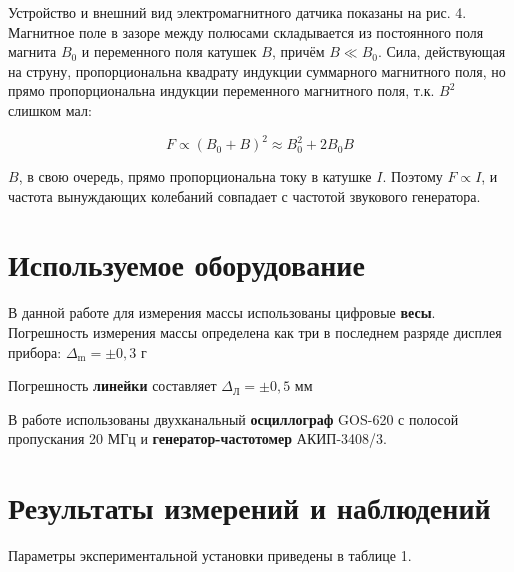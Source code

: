 \documentclass{article}
\begin{document}
\hspace{4mm} Устройство и внешний вид электромагнитного датчика показаны на рис. 4. Магнитное поле в зазоре между полюсами складывается из постоянного поля магнита $B_0$ и переменного поля катушек $B$, причём $B \ll B_0$. Сила, действующая на струну, пропорциональна квадрату индукции суммарного магнитного поля, но прямо пропорциональна индукции переменного магнитного поля, т.к. $B^2$ слишком мал:

\begin{equation}
	F \propto (B_0 + B)^2 \approx B_0^2 + 2B_0B
\end{equation}

$B$, в свою очередь, прямо пропорциональна току в катушке $I$. Поэтому $F \propto I$, и частота вынуждающих колебаний совпадает с частотой звукового генератора.



\section*{Используемое оборудование}

\hspace{4mm} В данной работе для измерения массы использованы цифровые \textbf{весы}. Погрешность измерения массы определена как три в последнем разряде дисплея прибора: $\Delta_{\text{m}} = \pm 0,3$ г

Погрешность \textbf{линейки} составляет $\Delta_{\text{Л}} = \pm 0,5$ мм 

В работе использованы двухканальный \textbf{осциллограф} GOS-620 с полосой пропускания 20 МГц и \textbf{генератор-частотомер} АКИП-3408/3.

\section*{Результаты измерений и наблюдений}

\hspace{4mm} Параметры экспериментальной установки приведены в таблице 1.  

\begin{table}[h!]
	\centering
\end{table}
\end{document}
